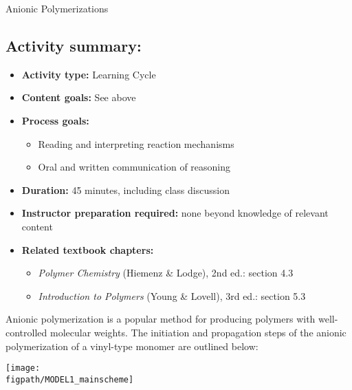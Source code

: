 \begin{activity}{Anionic Polymerizations}
\begin{instructornotes}
	\subsection*{Activity summary:}
	\begin{itemize}
		\item \textbf{Activity type:} Learning Cycle
		\item \textbf{Content goals:} See above
		\item \textbf{Process goals:} %
			\begin{itemize}
				\item Reading and interpreting reaction mechanisms
				\item Oral and written communication of reasoning
			\end{itemize}
		\item \textbf{Duration:} 45 minutes, including class discussion
		\item \textbf{Instructor preparation required:} none beyond knowledge of relevant content
		\item \textbf{Related textbook chapters:}
			\begin{itemize}
				\item \emph{Polymer Chemistry} (Hiemenz \& Lodge), 2nd ed.: section 4.3
				\item \emph{Introduction to Polymers} (Young \& Lovell), 3rd ed.: section 5.3
			\end{itemize}
	\end{itemize}
	
\end{instructornotes}


\begin{model}
	\label{\labelbase:mdl:anionic}

	Anionic polymerization is a popular method for producing polymers with well-controlled molecular weights.  The initiation and propagation steps of the anionic polymerization of a vinyl-type monomer are outlined below:
	
	\centerline{\texttt{[image: \\figpath/MODEL1\_mainscheme]}}
	
\end{model}



\end{activity}
